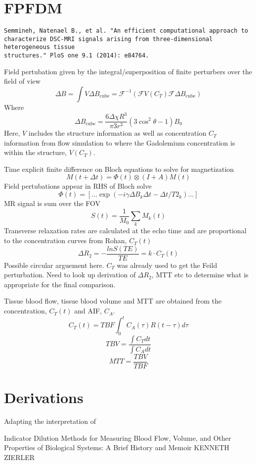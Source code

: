 \documentclass[12pt]{article}
\begin{document}
\section{FPFDM}

\begin{verbatim}
Semmineh, Natenael B., et al. "An efficient computational approach to
characterize DSC-MRI signals arising from three-dimensional heterogeneous tissue
structures." PloS one 9.1 (2014): e84764.
\end{verbatim}

Field pertubation given by the integral/superposition of finite perturbers over
the field of view
\[
\Delta B =  \int V \Delta B_\text{cube}  = \mathcal{F}^{-1} \left( \mathcal{F} V(C_T) \mathcal{F} \Delta B_\text{cube} \right)
\]
Where
\[
\Delta B_\text{cube}  = \frac{ 6 \Delta \chi R^3} {\pi 3 r^3} (3 \cos^2 \theta-1) B_0
\]
Here, $V$ includes the  structure information as well as concentration $C_T$
information from flow simulation to
where the Gadolemium concentration is within the structure, $V(C_T)$.

Time explicit finite difference on Bloch equations to solve for magnetization
\[
M(t+\Delta t) = \Phi(t) \otimes (I+A)M(t)
\]
Field pertubations appear in RHS of Bloch solve
\[
\Phi(t) = [ \dots \exp(-i \gamma \Delta B_k \Delta t - \Delta t / T2_k) \dots ] 
\]
MR signal is sum over the FOV
\[
S(t) = \frac{1}{M_0} \sum_k M_k(t)
\]
Transverse relaxation rates are calculated at the echo time and are proportional
to the concentration curves from Rohan, $C_T(t)$
\[
\Delta R_2 = - \frac{ ln S(TE)}{TE} = k \cdot C_T(t)
\]
{\color{red} Possible circular arguement here. $C_T$ was already used to get the
Feild perturbation. Need to look up derivation of $\Delta R_2$, MTT etc to
determine what is appropriate for the final comparison.}

Tissue blood flow, tissue blood volume and MTT are obtained from the
concentration, $C_T(t)$ and AIF, $C_A$.
\[
C_T(t) = TBF \int_0^t C_A(\tau) R (t-\tau) d\tau
\]
\[
TBV = \frac{ \int C_T dt}{\int C_A dt}
\]
\[
MTT = \frac{TBV}{TBF}
\]


\pagebreak
\section{Derivations}
Adapting  the interpretation of 

Indicator Dilution Methods for Measuring Blood Flow, Volume,
and Other Properties of Biological Systems:
A Brief History and Memoir
KENNETH ZIERLER
\end{document}
